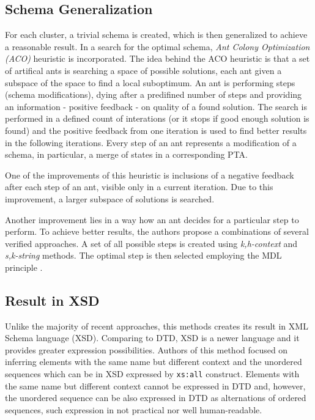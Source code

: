 \subsection{Schema Generalization}
For each cluster, a trivial schema is created, which is then generalized to achieve a reasonable result. In a search for the optimal schema, \emph{Ant Colony Optimization (ACO)} heuristic is incorporated. The idea behind the ACO heuristic is that a set of artifical ants is searching a space of possible solutions, each ant given a subspace of the space to find a local suboptimum. An ant 
is performing steps (schema modifications), dying after a predifined number of steps and providing an information - positive feedback - on quality of a found solution. The search is performed in a defined count of interations (or it stops if good enough solution is found) and the positive feedback from one iteration is used to find better results in the following iterations. Every step of an ant represents a modification of a schema, in particular, a merge of states in a corresponding PTA.

One of the improvements of this heuristic is inclusions of a negative feedback after each step of an ant, visible only in a current iteration. Due to this improvement, a larger subspace of solutions is searched.

Another improvement lies in a way how an ant decides for a particular step to perform. To achieve better results, the authors propose a combinations of several verified approaches. A set of all possible steps is created using \emph{k,h-context} and \emph{s,k-string}  methods. The optimal step is then selected employing the MDL principle .

\subsection{Result in XSD}
Unlike the majority of recent approaches, this methods creates its result in XML Schema language (XSD). Comparing to DTD, XSD is a newer language and it provides greater expression possibilities. Authors of this method focused on inferring elements with the same name but different context and the unordered sequences which can be in XSD expressed by \texttt{xs:all} construct. Elements with the same name but different context cannot be expressed in DTD and, however, the unordered sequence can be also expressed in DTD as alternations of ordered sequences, such expression in not practical nor well human-readable.

